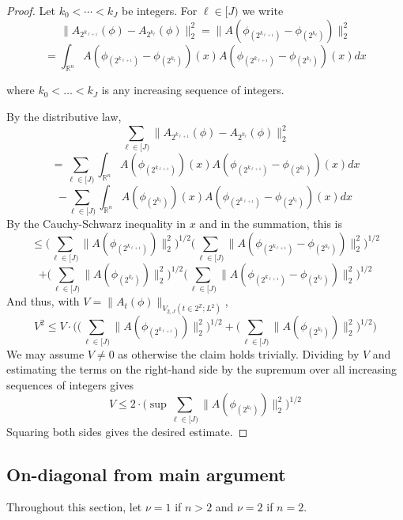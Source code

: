 \documentclass[12pt,reqno]{amsart}
\theoremstyle{plain}
\numberwithin{equation}{section}
\theoremstyle{remark}
\newcommand{\R}{{\mathbb R}}
\begin{document}
\begin{proof}
Let $k_0<\cdots <k_{J}$ be integers. For $\ell \in [J)$ we write
\begin{equation}
    \label{expandrhs}
    \|A_{2^{k_{\ell+1}}}(\phi)-A_{2^{k_{\ell}}}(\phi)\|_2^2 = \|A(\phi_{(2^{k_{\ell+1}})}-\phi_{(2^{k_\ell})})\|_2^2
    \end{equation}
 \[= \int_{\R^n} A(\phi_{(2^{k_{\ell+1}})}-\phi_{(2^{k_{\ell}})})(x)A(\phi_{(2^{k_{\ell+1}})}-\phi_{(2^{k_{\ell}})})(x)  dx \]

    where  $k_0<\ldots < k_J$ is any increasing sequence of integers.


By the distributive law,
  \[\sum_{\ell\in [J)}  \|A_{2^{k_{\ell+1}}}(\phi)-A_{2^{k_{\ell}}}(\phi)\|_2^2 \]
\[ = \sum_{\ell\in [J)} \int_{\R^n} A(\phi_{(2^{k_{\ell+1}})})(x)A(\phi_{(2^{k_{\ell+1}})}-\phi_{(2^{k_{\ell}})})(x)  dx \]
\[ - \sum_{\ell\in [J)}  \int_{\R^n} A(\phi_{(2^{k_{\ell}})})(x)A(\phi_{(2^{k_{\ell+1}})}-\phi_{(2^{k_{\ell}})})(x)  dx \]
By the Cauchy-Schwarz inequality in $x$ and in the summation,  this is
\[ \le  \Big ( \sum_{\ell\in [J)}  \|A(\phi_{(2^{k_{\ell+1}})})\|^2_2 \Big)^{1/2} \Big (\sum_{\ell\in [J)} \|A(\phi_{(2^{k_{\ell+1}})}-\phi_{(2^{k_{\ell}})})\|^2_2\Big)^{1/2}\]
\[+ \Big ( \sum_{\ell\in [J)} \|A(\phi_{(2^{k_{\ell}})})\|_2^2\Big)^{1/2} \Big(\sum_{\ell\in [J)} \|A(\phi_{(2^{k_{\ell+1}})}-\phi_{(2^{k_{\ell}})})\|^2_2\Big)^{1/2} \]
And thus, with $V= \|A_{t}(\phi)\|_{V_{2,J}(t\in 2^\mathbb{Z}; L^2)}$,
\[V^2 \le  V\cdot  \Big( \Big(\sum_{\ell\in [J)} \|A(\phi_{(2^{k_{\ell+1}})})\|^2_2\Big)^{1/2} + \Big( \sum_{\ell\in [J)} \|A(\phi_{(2^{k_{\ell}})})\|^2_2 \Big)^{1/2} \Big)   \]
We may assume $V\neq 0$  as otherwise the claim holds trivially. Dividing by $V$ and estimating the terms on the   right-hand side by the supremum over all increasing sequences of integers gives
\[V \le  2 \cdot  \Big( \sup \sum_{\ell\in [J)} \|A(\phi_{(2^{k_{\ell}})})\|^2_2\Big)^{1/2}     \]
Squaring both sides gives the desired estimate.
\end{proof}


\subsection{On-diagonal from main argument}\label{sec:off-diag}


Throughout this section, let
$\nu=1$ if $n>2$ and $\nu=2$ if $n=2$.
\end{document}
